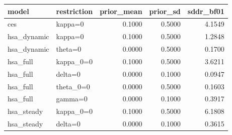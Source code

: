 \begin{tabular}{llrrr}
\toprule
model & restriction & prior\_mean & prior\_sd & sddr\_bf01 \\
\midrule
ces & kappa=0 & 0.1000 & 0.5000 & 4.1549 \\
hsa\_dynamic & kappa=0 & 0.1000 & 0.5000 & 1.2848 \\
hsa\_dynamic & theta=0 & 0.0000 & 0.5000 & 0.1700 \\
hsa\_full & kappa\_0=0 & 0.1000 & 0.5000 & 3.6211 \\
hsa\_full & delta=0 & 0.0000 & 0.1000 & 0.0947 \\
hsa\_full & theta\_0=0 & 0.0000 & 0.5000 & 0.1603 \\
hsa\_full & gamma=0 & 0.0000 & 0.1000 & 0.3917 \\
hsa\_steady & kappa\_0=0 & 0.1000 & 0.5000 & 6.1808 \\
hsa\_steady & delta=0 & 0.0000 & 0.1000 & 0.3615 \\
\bottomrule
\end{tabular}
